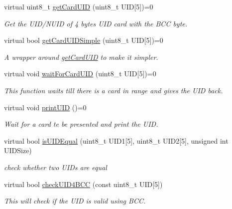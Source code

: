 \begin{DoxyCompactItemize}
virtual uint8\+\_\+t \mbox{\hyperlink{classrfid_afeb2a321694ceaf84db793f5efb3a750}{get\+Card\+U\+ID}} (uint8\+\_\+t U\+ID\mbox{[}5\mbox{]})=0
\begin{DoxyCompactList}\small\item\em Get the U\+I\+D/\+N\+U\+ID of 4 bytes U\+ID card with the B\+CC byte. \end{DoxyCompactList}\item 
virtual bool \mbox{\hyperlink{classrfid_aaeb826495120d8d29683f0ea1b985d77}{get\+Card\+U\+I\+D\+Simple}} (uint8\+\_\+t U\+ID\mbox{[}5\mbox{]})=0
\begin{DoxyCompactList}\small\item\em A wrapper around \mbox{\hyperlink{classrfid_afeb2a321694ceaf84db793f5efb3a750}{get\+Card\+U\+ID}} to make it simpler. \end{DoxyCompactList}\item 
virtual void \mbox{\hyperlink{classrfid_a1b324cb1e7b4c377eca4b3495d4189fd}{wait\+For\+Card\+U\+ID}} (uint8\+\_\+t U\+ID\mbox{[}5\mbox{]})=0
\begin{DoxyCompactList}\small\item\em This function waits till there is a card in range and gives the U\+ID back. \end{DoxyCompactList}\item 
virtual void \mbox{\hyperlink{classrfid_a4efe585f73e584d792347c2891300ad2}{print\+U\+ID}} ()=0
\begin{DoxyCompactList}\small\item\em Wait for a card te be presented and print the U\+ID. \end{DoxyCompactList}\item 
virtual bool \mbox{\hyperlink{classrfid_a8c239b8e42f20d4310c44368bd5030a7}{is\+U\+I\+D\+Equal}} (uint8\+\_\+t U\+I\+D1\mbox{[}5\mbox{]}, uint8\+\_\+t U\+I\+D2\mbox{[}5\mbox{]}, unsigned int U\+I\+D\+Size)
\begin{DoxyCompactList}\small\item\em check whether two U\+I\+Ds are equal \end{DoxyCompactList}\item 
virtual bool \mbox{\hyperlink{classrfid_a4ca2918b2b7011a6eb685ea547c21826}{check\+U\+I\+D4\+B\+CC}} (const uint8\+\_\+t U\+ID\mbox{[}5\mbox{]})
\begin{DoxyCompactList}\small\item\em This will check if the U\+ID is valid using B\+CC. \end{DoxyCompactList}\item 

\end{DoxyCompactItemize}
